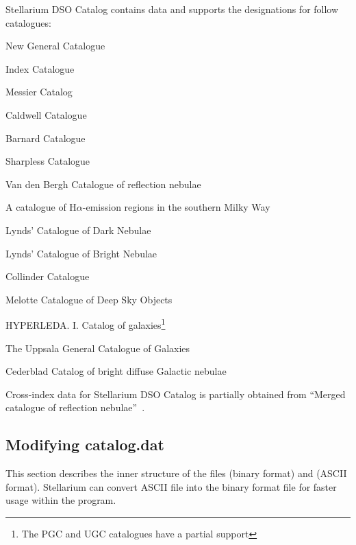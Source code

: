 Stellarium DSO Catalog contains data and supports the designations for
follow catalogues:

\begin{description}[align=right,labelwidth=2cm]
\item[\textbf{NGC}]  New General Catalogue 
\item[\textbf{IC}] Index Catalogue 
\item[\textbf{M}] Messier Catalog
\item[\textbf{C}] Caldwell Catalogue 
\item[\textbf{B}] Barnard Catalogue~\cite{1927cdos.book.....B} 
\item[\textbf{Sh2}] Sharpless Catalogue~\cite{1959ApJS....4..257S} 
\item[\textbf{VdB}] Van den Bergh Catalogue of reflection nebulae~\cite{1966AJ.....71..990V} 
\item[\textbf{RCW}]  A catalogue of H$\alpha$-emission regions in the southern Milky Way~\cite{1960MNRAS.121..103R} 
\item[\textbf{LDN}]  Lynds' Catalogue of Dark Nebulae~\cite{1962ApJS....7....1L} 
\item[\textbf{LBN}]  Lynds' Catalogue of Bright Nebulae~\cite{1965ApJS...12..163L} 
\item[\textbf{Cr}] Collinder Catalogue~\cite{1931AnLun...2....1C} 
\item[\textbf{Mel}]  Melotte Catalogue of Deep Sky Objects~\cite{1915MmRAS..60..175M} 
\item[\textbf{PGC}]  HYPERLEDA. I. Catalog of galaxies\footnote{The PGC and UGC catalogues have a partial support}
\item[\textbf{UGC}]  The Uppsala General Catalogue of Galaxies
\item[\textbf{Ced}]  Cederblad Catalog of bright diffuse Galactic nebulae~\cite{1946MeLuS.119....1C}
\end{description}

Cross-index data for Stellarium DSO Catalog is partially obtained from ``Merged catalogue of reflection nebulae''~\cite{2003A&A...399..141M}.

\subsection{Modifying catalog.dat}
\label{sec:dso:modifyingCatalog.dat}

This section describes the inner structure of the files 
(binary format) and  (ASCII format).
Stellarium can convert ASCII file into the binary format file for faster usage
within the program.

